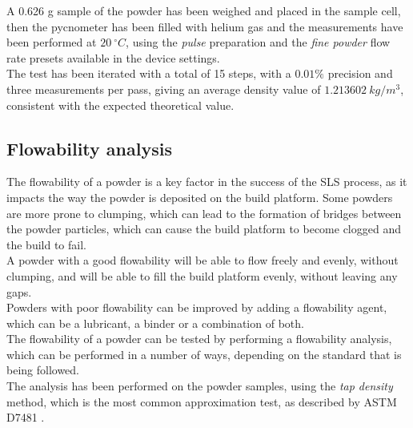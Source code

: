 \documentclass{article}
\begin{document}
        A 0.626 g sample of the powder has been weighed and placed in the sample cell, then the pycnometer has been filled with 
        helium gas and the measurements have been performed at $20 \ ^{\circ}C$, using the \textit{pulse} preparation and the 
        \textit{fine powder} flow rate presets available in the device settings. \\ 
    
        The test has been iterated with a total of 15 steps, with a $0.01 \%$ precision and three measurements per pass, giving an average 
        density value of $1.213602 \ kg/m^3$, consistent with the expected theoretical value. \\ 
    
        \clearpage

        \subsection{Flowability analysis\label{flowability_analysis}}

        The flowability of a powder is a key factor in the success of the SLS process, as it impacts the way the powder is deposited
        on the build platform. Some powders are more prone to clumping, which can lead to the formation of bridges between the powder 
        particles, which can cause the build platform to become clogged and the build to fail. \\ 

        A powder with a good flowability will be able to flow freely and evenly, without clumping, and will be able to fill the 
        build platform evenly, without leaving any gaps. \\ 

        Powders with poor flowability can be improved by adding a flowability agent, which can be a lubricant, a binder or a 
        combination of both. \\ 

        The flowability of a powder can be tested by performing a flowability analysis, which can be performed in a number of ways, 
        depending on the standard that is being followed. \\

        The analysis has been performed on the powder samples, using the \textit{tap density} method, which is the most common 
        approximation test, as described by ASTM D7481 \autocites{ASTM_D7481-18}. \\
\end{document}
